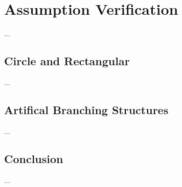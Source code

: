 \section{Assumption Verification}

...


\subsection{Circle and Rectangular}


...


\subsection{Artifical Branching Structures}


...


\subsection{Conclusion}


...
